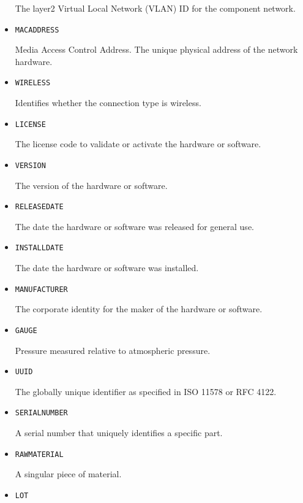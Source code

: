 \begin{itemize}
The layer2 Virtual Local Network (VLAN) ID for the component network.


\item \texttt{MAC\textunderscore ADDRESS}  

Media Access Control Address. The unique physical address of the network hardware.


\item \texttt{WIRELESS}  

Identifies whether the connection type is wireless.


\item \texttt{LICENSE}  

The license code to validate or activate the hardware or software.


\item \texttt{VERSION}  

The version of the hardware or software.



\item \texttt{RELEASE\textunderscore DATE}  

The date the hardware or software was released for general use.


\item \texttt{INSTALL\textunderscore DATE}  

The date the hardware or software was installed.


\item \texttt{MANUFACTURER}  

The corporate identity for the maker of the hardware or software.


\item \texttt{GAUGE}  

Pressure measured relative to atmospheric pressure.


\item \texttt{UUID}  

The globally unique identifier as specified in ISO 11578 or RFC 4122.


\item \texttt{SERIAL\textunderscore NUMBER}  

A serial number that uniquely identifies a specific part.


\item \texttt{RAW\textunderscore MATERIAL}  

A singular piece of material.


\item \texttt{LOT}  


\end{itemize}
